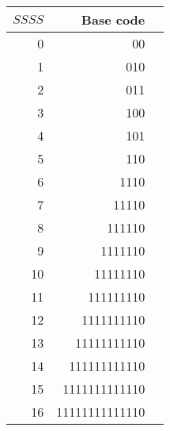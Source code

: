   \begin{tabular}{|r|r|l|}
    \hline
    $SSSS$ & Base code \\
    \hline
    0 & 00 \\
    1 & 010 \\
    2 & 011 \\
    3 & 100 \\
    4 & 101 \\
    5 & 110 \\
    6 & 1110 \\
    7 & 11110 \\
    8 & 111110 \\
    9 & 1111110 \\
    10 & 11111110 \\
    11 & 111111110 \\
    12 & 1111111110 \\
    13 & 11111111110 \\
    14 & 111111111110 \\
    15 & 1111111111110 \\
    16 & 11111111111110 \\
    \hline
  \end{tabular}
